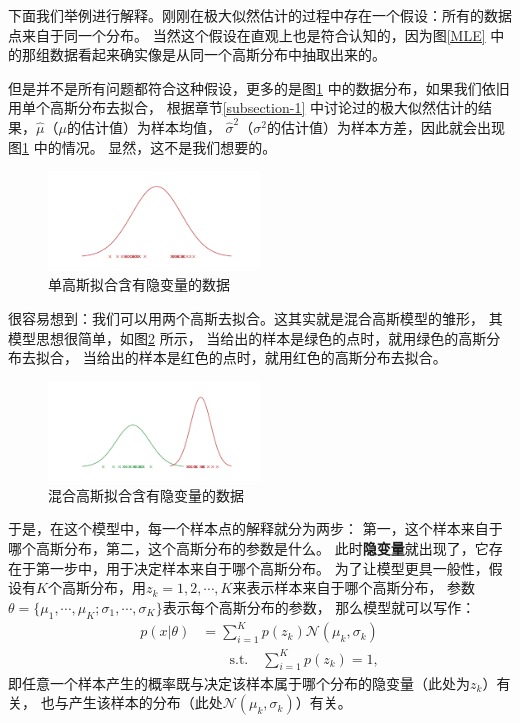 \documentclass[UTF8]{ctexart}
\begin{document}
下面我们举例进行解释。刚刚在极大似然估计的过程中存在一个假设：所有的数据点来自于同一个分布。
当然这个假设在直观上也是符合认知的，因为图\ref{MLE} 中的那组数据看起来确实像是从同一个高斯分布中抽取出来的。

但是并不是所有问题都符合这种假设，更多的是图\ref{latent variable-1} 中的数据分布，如果我们依旧用单个高斯分布去拟合，
根据章节\ref{subsection-1} 中讨论过的极大似然估计的结果，$\hat\mu$（$\mu$的估计值）为样本均值，
$\hat\sigma^2$（$\sigma^2$的估计值）为样本方差，因此就会出现图\ref{latent variable-1} 中的情况。
显然，这不是我们想要的。

\begin{figure}[!h]
  \includegraphics[width=0.5\textwidth]{./figures/LV-1.pdf}
  \centering
  \caption{单高斯拟合含有隐变量的数据}
  \label{latent variable-1}
\end{figure}

很容易想到：我们可以用两个高斯去拟合。这其实就是混合高斯模型的雏形，
其模型思想很简单，如图\ref{latent variable-2} 所示，
当给出的样本是绿色的点时，就用绿色的高斯分布去拟合，
当给出的样本是红色的点时，就用红色的高斯分布去拟合。

\begin{figure}[!h]
  \includegraphics[width=0.5\textwidth]{./figures/LV-2.pdf}
  \centering
  \caption{混合高斯拟合含有隐变量的数据}
  \label{latent variable-2}
\end{figure}

于是，在这个模型中，每一个样本点的解释就分为两步：
第一，这个样本来自于哪个高斯分布，第二，这个高斯分布的参数是什么。
此时\textbf{隐变量}就出现了，它存在于第一步中，用于决定样本来自于哪个高斯分布。
为了让模型更具一般性，假设有$K$个高斯分布，用$z_k={1, 2, \cdots, K}$来表示样本来自于哪个高斯分布，
参数$\theta=\{\mu_1, \cdots, \mu_K; \sigma_1, \cdots, \sigma_K\}$表示每个高斯分布的参数，
那么模型就可以写作：
\begin{equation}
  \begin{split}
    p(x|\theta) &= \sum_{i=1}^{K}p(z_k) \mathcal{N}(\mu_k, \sigma_k)\\
    & \quad\quad \mathrm{s.t.} \quad \sum_{i=1}^{K}p(z_k) = 1,
  \end{split}
\end{equation}
即任意一个样本产生的概率既与决定该样本属于哪个分布的隐变量（此处为$z_k$）有关，
也与产生该样本的分布（此处$\mathcal{N}(\mu_k, \sigma_k)$）有关。
\end{document}
